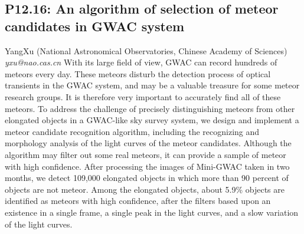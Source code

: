 \documentclass{report}
\begin{document}
\subsection*{P12.16: An algorithm of selection of meteor candidates in GWAC system}
\bigskip
YangXu (National Astronomical Observatories, Chinese Academy of Sciences) \newline   \newline   \newline   \newline  \newline  \newline\newline
{\it yxu@nao.cas.cn}\newline
\newline\newline
With its large field of view, GWAC can record hundreds of meteors every day. These meteors disturb the detection process of optical transients in the GWAC system, and may be a valuable treasure for some meteor research groups. It is therefore very important to accurately find all of these meteors. To address the challenge of precisely distinguishing meteors from other elongated objects in a GWAC-like sky survey system, we design and implement a meteor candidate recognition algorithm, including the recognizing and morphology analysis of the light curves of the meteor candidates. Although the algorithm may filter out some real meteors, it can provide a sample of meteor with high confidence. After processing the images of Mini-GWAC taken in two months, we detect 109,000 elongated objects in which more than 90 percent of objects are not meteor. Among the elongated objects, about 5.9\% objects are identified as meteors with high confidence, after the filters based upon an existence in a single frame, a single peak in the light curves, and a slow variation of the light curves.\newline
\newpage
\end{document}
